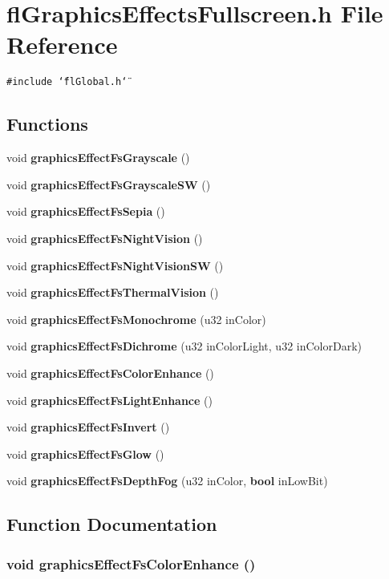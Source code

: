 \section{fl\-Graphics\-Effects\-Fullscreen.h File Reference}
\label{flGraphicsEffectsFullscreen_8h}
{\tt \#include \char`\"{}fl\-Global.h\char`\"{}}\par
\subsection*{Functions}
\begin{CompactItemize}
\item 
void {\bf graphics\-Effect\-Fs\-Grayscale} ()
\item 
void {\bf graphics\-Effect\-Fs\-Grayscale\-SW} ()
\item 
void {\bf graphics\-Effect\-Fs\-Sepia} ()
\item 
void {\bf graphics\-Effect\-Fs\-Night\-Vision} ()
\item 
void {\bf graphics\-Effect\-Fs\-Night\-Vision\-SW} ()
\item 
void {\bf graphics\-Effect\-Fs\-Thermal\-Vision} ()
\item 
void {\bf graphics\-Effect\-Fs\-Monochrome} (u32 in\-Color)
\item 
void {\bf graphics\-Effect\-Fs\-Dichrome} (u32 in\-Color\-Light, u32 in\-Color\-Dark)
\item 
void {\bf graphics\-Effect\-Fs\-Color\-Enhance} ()
\item 
void {\bf graphics\-Effect\-Fs\-Light\-Enhance} ()
\item 
void {\bf graphics\-Effect\-Fs\-Invert} ()
\item 
void {\bf graphics\-Effect\-Fs\-Glow} ()
\item 
void {\bf graphics\-Effect\-Fs\-Depth\-Fog} (u32 in\-Color, {\bf bool} in\-Low\-Bit)
\end{CompactItemize}


\subsection{Function Documentation}
\subsubsection{\setlength{\rightskip}{0pt plus 5cm}void graphics\-Effect\-Fs\-Color\-Enhance ()}\label{flGraphicsEffectsFullscreen_8h_ead926c7b04516d1bb97b72c9e0c1365}




